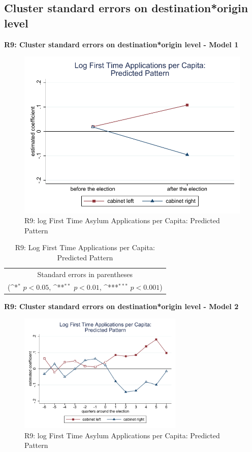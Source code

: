 \documentclass[10pt,a4paper]{scrartcl}
\begin{document}
\subsection{Cluster standard errors on destination*origin level}
\textbf{R9: Cluster standard errors on destination*origin level - Model 1}
\begin{figure}[!ht]
	\centering
	\includegraphics[width=1\textwidth]{figures_edited/app_graph1_R9.pdf}
	\caption{R9: log First Time Asylum Applications per Capita: Predicted Pattern}
\end{figure}

\begin{table}[!ht]\centering
	\renewcommand{\arraystretch}{1.25}
	\def\sym#1{\ifmmode^{#1}\else\(^{#1}\)\fi}
	\caption{R9: Log First Time Applications per Capita: Predicted Pattern}
	\begin{tabular}{l*{2}{c}}
		\hline\hline
		
		\hline\hline
		\multicolumn{3}{c}{\footnotesize Standard errors in parentheses} \\
		\multicolumn{3}{c}{\footnotesize (\sym{*} \(p<0.05\), \sym{**} \(p<0.01\), \sym{***} \(p<0.001\))}\\
	\end{tabular}
\end{table}

\clearpage
\textbf{R9: Cluster standard errors on destination*origin level - Model 2}
\begin{figure}[!ht]
	\centering
	\includegraphics[width=0.7\textwidth]{figures_edited/app_graph2_R9.pdf}
	\caption{R9: log First Time Asylum Applications per Capita: Predicted Pattern}
\end{figure}
\end{document}

